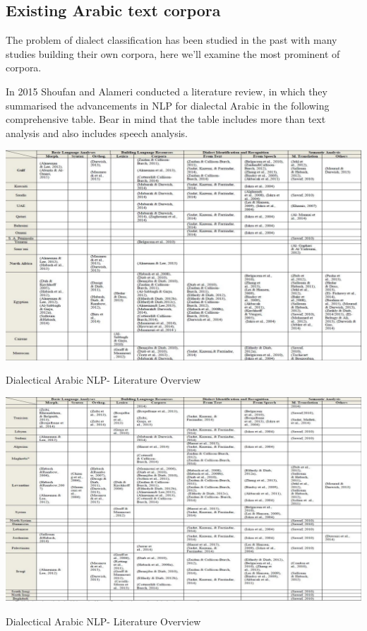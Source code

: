 \documentclass[12pt]{diazessay}
\begin{document}
        
    \subsection{Existing Arabic text corpora}
    The problem of dialect classification has been studied in the past with many studies building their own corpora, here we'll examine the most prominent of corpora.
    
    In 2015 Shoufan and Alameri conducted a literature review, in which they summarised the advancements in NLP for dialectal Arabic in the following comprehensive table\cite{shoufan_alameri_2015_natural}. Bear in mind that the table includes more than text analysis and also includes speech analysis.
    
    \clearpage
    \begin{table}[h]
        \hskip-3cm
        \includegraphics[scale=0.45]{Figures/past_word_1.png}
        \caption{Dialectical Arabic NLP- Literature Overview\cite{shoufan_alameri_2015_natural}}
        \label{fig:cmp}
    \end{table}
    
    \clearpage
    \begin{table}[h]
        \hskip-3cm
        \includegraphics[scale=0.45]{Figures/past_work_2.png}
        \caption{Dialectical Arabic NLP- Literature Overview\cite{shoufan_alameri_2015_natural}}
        \label{fig:cmp}
    \end{table}
    \clearpage
    
\end{document}
